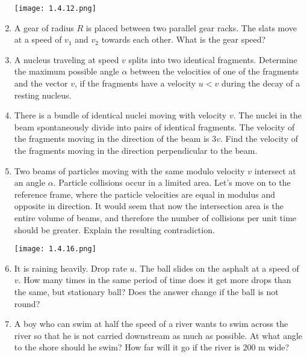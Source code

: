 \documentclass{article}
\begin{document}
\begin{enumerate}[label=1.4.\arabic*]
\begin{center}
    \texttt{[image: 1.4.12.png]}
\end{center}

\item A gear of radius $R$ is placed between two parallel gear racks. The slats move at a speed of $v_1$ and $v_2$ towards each other. What is the gear speed?

\item A nucleus traveling at speed $v$ splits into two identical fragments. Determine the maximum possible angle $\alpha$ between the velocities of one of the fragments and the vector $v$, if the fragments have a velocity $u < v$ during the decay of a resting nucleus.

\item There is a bundle of identical nuclei moving with velocity $v$. The nuclei in the beam spontaneously divide into pairs of identical fragments. The velocity of the fragments moving in the direction of the beam is $3v$. Find the velocity of the fragments moving in the direction perpendicular to the beam.

\item Two beams of particles moving with the same modulo velocity $v$ intersect at an angle $\alpha$. Particle collisions occur in a limited area. Let's move on to the reference frame, where the particle velocities are equal in modulus and opposite in direction. It would seem that now the intersection area is the entire volume of beams, and therefore the number of collisions per unit time should be greater. Explain the resulting contradiction.

\begin{center}
    \texttt{[image: 1.4.16.png]}
\end{center}

\item It is raining heavily. Drop rate $u$. The ball slides on the asphalt at a speed of $v$. How many times in the same period of time does it get more drops than the same, but stationary ball? Does the answer change if the ball is not round?

\item A boy who can swim at half the speed of a river wants to swim across the river so that he is not carried downstream as much as possible. At what angle to the shore should he swim? How far will it go if the river is $200$ m wide?




\end{enumerate}
\end{document}

